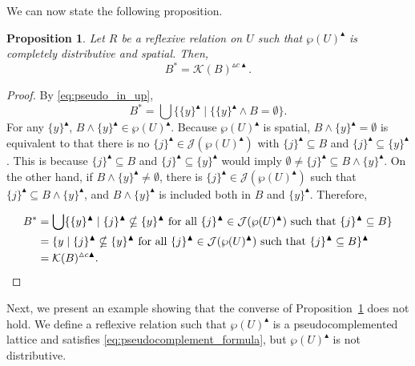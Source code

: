\documentclass[11pt,a4paper]{amsart}
\newcommand{\UP}{\blacktriangle}
\newcommand{\Up}{\vartriangle}
\theoremstyle{plain}
\newtheorem{proposition}[theorem]{Proposition}
\theoremstyle{definition}
\theoremstyle{remark}
\numberwithin{equation}{section}
\begin{document}
We can now state the following proposition.

\begin{proposition} \label{prop:upper_pseudo}
Let $R$ be a reflexive relation on $U$ such that 
$\wp(U)^\UP$ is completely distributive 
and spatial. Then, 
\begin{equation} \label{eq:pseudocomplement_formula}    
B^* = \mathcal{K}(B)^{\Up c \UP}. 
\end{equation}
\end{proposition}

\begin{proof} By \eqref{eq:pseudo_in_up},
\[ B^* = \bigcup \{\{y\}^\UP \mid \{\{y\}^\UP \wedge B = \emptyset\}.\]
For any $\{y\}^\UP$, $B \wedge \{y\}^\UP \in \wp (U)^\UP$.
Because $\wp(U)^\UP$ is spatial, $B \wedge\{y\}^\UP =\emptyset$ is
equivalent to that there is no  
$\{j\}^\UP \in \mathcal{J}(\wp(U)^\UP)$ with  $\{j\}^\UP \subseteq B$ and 
$\{j\}^\UP \subseteq \{y\}^\UP$. This is because $\{j\}^\UP \subseteq B$
and $\{j\}^\UP \subseteq \{y\}^\UP$ would imply 
$\emptyset \neq \{j\}^\UP \subseteq B \wedge \{y\}^\UP$. On the other
hand, if $B \wedge \{y\}^\UP \neq \emptyset$, there is 
$\{j\}^\UP \in \mathcal{J}(\wp(U)^\UP)$ such that
$\{j\}^\UP \subseteq B \wedge \{y\}^\UP$, and $B \wedge \{y\}^\UP$ is included both in $B$ and $\{y\}^\UP$. Therefore, 

\begin{align*}
B^* &= \bigcup \{ \{y\}^\UP \mid \{j\}^\UP \nsubseteq \{y\}^\UP 
\text{ for all } 
\{j\}^\UP \in \mathcal{J}(\wp(U)^\UP) \text{ such that }
\{j\}^\UP \subseteq B\} \\
&= \{ y \mid \{j\}^\UP \nsubseteq \{y\}^\UP \text{ for all } 
\{j\}^\UP \in \mathcal{J}(\wp(U)^\UP) \text{ such that } 
\{j\}^\UP \subseteq B \}^\UP \\
&= \mathcal{K}(B)^{\Up c \UP}. \qedhere
\end{align*}
\end{proof}

Next, we present an example showing that the converse of Proposition~\ref{prop:upper_pseudo} does not hold. 
We define a reflexive relation such that $\wp(U)^\UP$ is a pseudocomplemented lattice and satisfies  \eqref{eq:pseudocomplement_formula}, 
but $\wp(U)^\UP$ is not distributive.
\end{document}
